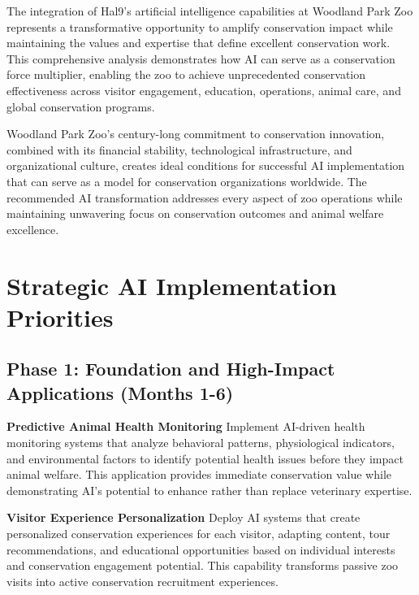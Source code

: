 \documentclass[
  Letterpaper,
]{scrbook}
\begin{document}

The integration of Hal9's artificial intelligence capabilities at
Woodland Park Zoo represents a transformative opportunity to amplify
conservation impact while maintaining the values and expertise that
define excellent conservation work. This comprehensive analysis
demonstrates how AI can serve as a conservation force multiplier,
enabling the zoo to achieve unprecedented conservation effectiveness
across visitor engagement, education, operations, animal care, and
global conservation programs.

Woodland Park Zoo's century-long commitment to conservation innovation,
combined with its financial stability, technological infrastructure, and
organizational culture, creates ideal conditions for successful AI
implementation that can serve as a model for conservation organizations
worldwide. The recommended AI transformation addresses every aspect of
zoo operations while maintaining unwavering focus on conservation
outcomes and animal welfare excellence.

\section*{Strategic AI Implementation
Priorities}\label{strategic-ai-implementation-priorities}


\subsection*{Phase 1: Foundation and High-Impact Applications (Months
1-6)}\label{phase-1-foundation-and-high-impact-applications-months-1-6}

\textbf{Predictive Animal Health Monitoring} Implement AI-driven health
monitoring systems that analyze behavioral patterns, physiological
indicators, and environmental factors to identify potential health
issues before they impact animal welfare. This application provides
immediate conservation value while demonstrating AI's potential to
enhance rather than replace veterinary expertise.

\textbf{Visitor Experience Personalization} Deploy AI systems that
create personalized conservation experiences for each visitor, adapting
content, tour recommendations, and educational opportunities based on
individual interests and conservation engagement potential. This
capability transforms passive zoo visits into active conservation
recruitment experiences.
\end{document}
